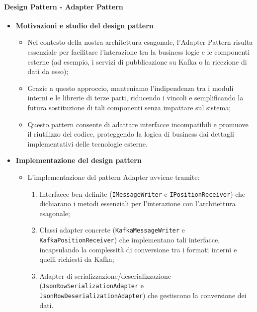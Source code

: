 \documentclass[10pt]{article}
\begin{document}
        
    \paragraph{Design Pattern - Adapter Pattern}
    \begin{itemize} 
    \item \textbf{Motivazioni e studio del design pattern}
    \begin{itemize}
        \item Nel contesto della nostra architettura esagonale, l'Adapter Pattern risulta essenziale per facilitare l'interazione tra la business logic e le componenti esterne (ad esempio, i servizi di pubblicazione su Kafka o la ricezione di dati da esso);
        \item Grazie a questo approccio, manteniamo l'indipendenza tra i moduli interni e le librerie di terze parti, riducendo i vincoli e semplificando la futura sostituzione di tali componenti senza impattare sul sistema;
        \item Questo pattern consente di adattare interfacce incompatibili e promuove il riutilizzo del codice, proteggendo la logica di business dai dettagli implementativi delle tecnologie esterne.
    \end{itemize}
    
    \item \textbf{Implementazione del design pattern}
    \begin{itemize}
        \item L'implementazione del pattern Adapter avviene tramite:
        \begin{enumerate}
            \item Interfacce ben definite (\texttt{IMessageWriter} e \texttt{IPositionReceiver}) che dichiarano i metodi essenziali per l'interazione con l'architettura esagonale;
            \item Classi adapter concrete (\texttt{KafkaMessageWriter} e \texttt{KafkaPositionReceiver}) che implementano tali interfacce, incapsulando la complessità di conversione tra i formati interni e quelli richiesti da Kafka;
            \item Adapter di serializzazione/deserializzazione (\texttt{JsonRowSerializationAdapter} e \\ \texttt{JsonRowDeserializationAdapter}) che gestiscono la conversione dei dati.
        \end{enumerate}
    \end{itemize}
    

\end{itemize}
\end{document}
